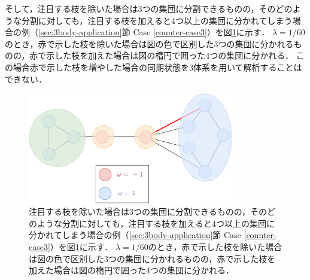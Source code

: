 \documentclass[../main]{subfiles}
\begin{document}
そして，注目する枝を除いた場合は3つの集団に分割できるものの，そのどのような分割に対しても，注目する枝を加えると4つ以上の集団に分かれてしまう場合の例（\ref{sec:3body-application}節 Case \ref{counter-case3}）を図\ref{fig:3body-counter3}に示す．
$\lambda=1/60$のとき，赤で示した枝を除いた場合は図の色で区別した3つの集団に分かれるものの，赤で示した枝を加えた場合は図の楕円で囲った4つの集団に分かれる．
この場合赤で示した枝を増やした場合の同期状態を3体系を用いて解析することはできない．

\begin{figure}[tbp]
    \centering
    \includegraphics[width=90mm]{./images/three-body-counter3.pdf}
    \centering
    \caption{注目する枝を除いた場合は3つの集団に分割できるものの，そのどのような分割に対しても，注目する枝を加えると4つ以上の集団に分かれてしまう場合の例（\ref{sec:3body-application}節 Case \ref{counter-case3}）を図\ref{fig:3body-counter3}に示す．
    $\lambda=1/60$のとき，赤で示した枝を除いた場合は図の色で区別した3つの集団に分かれるものの，赤で示した枝を加えた場合は図の楕円で囲った4つの集団に分かれる．}
    \label{fig:3body-counter3}
\end{figure}
 
\end{document}

